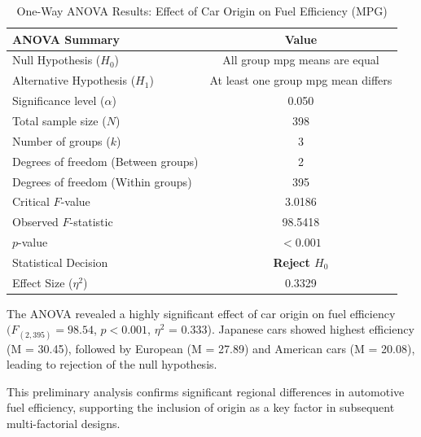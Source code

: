\documentclass[12pt]{article}
\begin{document}
\begin{table}[h!]
\centering
\caption{One-Way ANOVA Results: Effect of Car Origin on Fuel Efficiency (MPG)}
\label{tab:anova_results}
\begin{tabular}{lc}
\toprule
\textbf{ANOVA Summary} & \textbf{Value} \\
\midrule
Null Hypothesis ($H_0$) & All group mpg means are equal \\
Alternative Hypothesis ($H_1$) & At least one group mpg mean differs \\
Significance level ($\alpha$) & 0.050 \\
\midrule
Total sample size ($N$) & 398 \\
Number of groups ($k$) & 3 \\
Degrees of freedom (Between groups) & 2 \\
Degrees of freedom (Within groups) & 395 \\
Critical $F$-value & 3.0186 \\
Observed $F$-statistic & 98.5418 \\
$p$-value & $< 0.001$ \\
\midrule
Statistical Decision & \textbf{Reject $H_0$} \\
Effect Size ($\eta^2$) & 0.3329 \\
\bottomrule
\end{tabular}
\end{table}

The ANOVA revealed a highly significant effect of car origin on fuel efficiency
\((F_{(2,395)} = 98.54\), \(p < 0.001\), $\eta^2$ = 0.333). Japanese cars showed highest efficiency (M = 30.45), 
followed by European (M = 27.89) and American cars (M = 20.08), leading to rejection of the null hypothesis.

This preliminary analysis confirms significant regional differences in automotive fuel efficiency, supporting 
the inclusion of origin as a key factor in subsequent multi-factorial designs.


\clearpage
\end{document}
